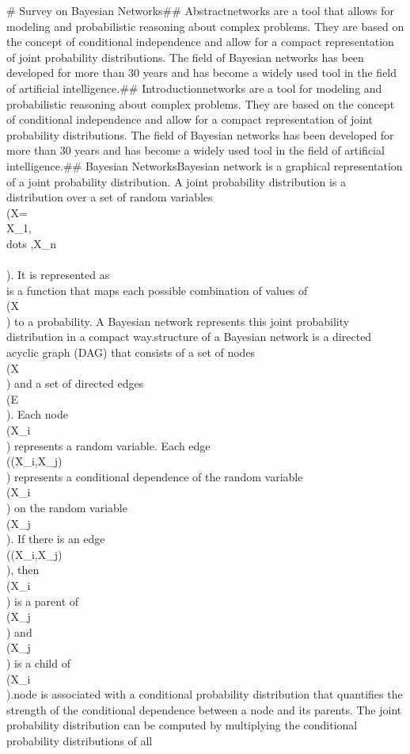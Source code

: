 # Survey on Bayesian Networks\n\n## Abstract\n\nBayesian networks are a tool that allows for modeling and probabilistic reasoning about complex problems. They are based on the concept of conditional independence and allow for a compact representation of joint probability distributions. The field of Bayesian networks has been developed for more than 30 years and has become a widely used tool in the field of artificial intelligence.\n\n## Introduction\n\nBayesian networks are a tool for modeling and probabilistic reasoning about complex problems. They are based on the concept of conditional independence and allow for a compact representation of joint probability distributions. The field of Bayesian networks has been developed for more than 30 years and has become a widely used tool in the field of artificial intelligence.\n\n## Bayesian Networks\n\nA Bayesian network is a graphical representation of a joint probability distribution. A joint probability distribution is a distribution over a set of random variables \\(X=\\{X_{1},\\dots ,X_{n}\\}\\). It is represented as\n\n\\[P(X_{1},\\dots ,X_{n})=P(X)\\]\n\nand is a function that maps each possible combination of values of \\(X\\) to a probability. A Bayesian network represents this joint probability distribution in a compact way.\n\nThe structure of a Bayesian network is a directed acyclic graph (DAG) that consists of a set of nodes \\(X\\) and a set of directed edges \\(E\\). Each node \\(X_{i}\\) represents a random variable. Each edge \\((X_{i},X_{j})\\) represents a conditional dependence of the random variable \\(X_{i}\\) on the random variable \\(X_{j}\\). If there is an edge \\((X_{i},X_{j})\\), then \\(X_{i}\\) is a parent of \\(X_{j}\\) and \\(X_{j}\\) is a child of \\(X_{i}\\).\n\nEach node is associated with a conditional probability distribution that quantifies the strength of the conditional dependence between a node and its parents. The joint probability distribution can be computed by multiplying the conditional probability distributions of all 